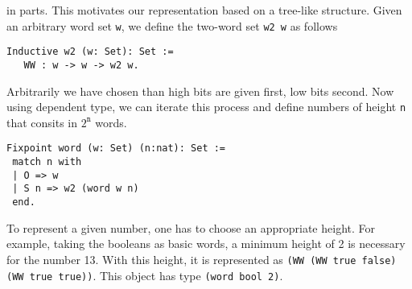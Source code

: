 in parts. 
This motivates our representation based on a tree-like structure. Given an arbitrary word set {\tt w}, we define
the two-word set {\tt w2 w} as follows 
\begin{verbatim}
Inductive w2 (w: Set): Set :=  
   WW : w -> w -> w2 w.
\end{verbatim}
Arbitrarily we have chosen than high bits are given first, low bits
second. Now using dependent type, we can iterate this process and define
numbers of height {\tt n} that consits in $2^\texttt{n}$ words.
\begin{verbatim}
Fixpoint word (w: Set) (n:nat): Set :=
 match n with
 | O => w
 | S n => w2 (word w n)
 end.
\end{verbatim}
To represent a given number, one has to choose an appropriate height.
For example, taking the booleans as basic words, a minimum
height of 2 is necessary for the number 13. With this height, it is represented 
as {\tt (WW (WW true false) (WW true true))}. This object has type {\tt (word bool 2)}.

